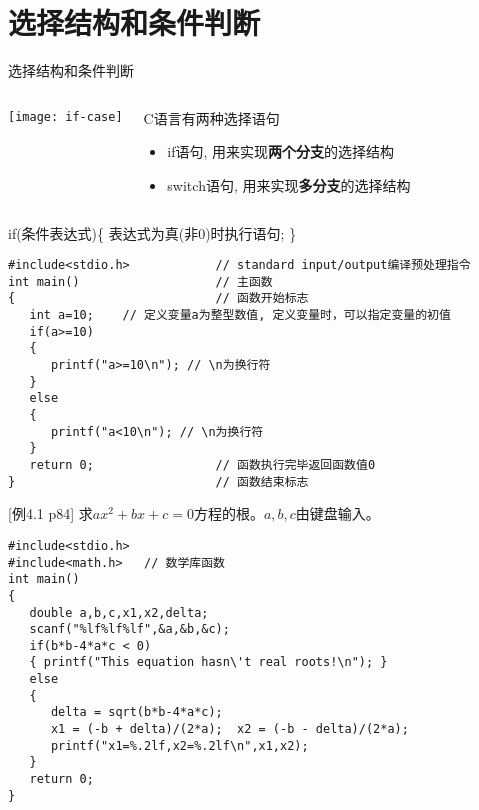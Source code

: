 
\section{选择结构和条件判断}

\begin{frame}{选择结构和条件判断}
\begin{columns}
	\texttt{[image: if-case]}
	\begin{block}{C语言有两种选择语句}
		\begin{itemize}
			\item if语句, 用来实现\textbf{两个分支}的选择结构
			\item switch语句, 用来实现\textbf{多分支}的选择结构
		\end{itemize}
	\end{block}
\end{columns}
\end{frame}

\begin{frame}[fragile]{if(条件表达式)\{ 表达式为真(非0)时执行语句; \}}
\begin{lstlisting}
#include<stdio.h>            // standard input/output编译预处理指令
int main()                   // 主函数
{                            // 函数开始标志
   int a=10;    // 定义变量a为整型数值, 定义变量时，可以指定变量的初值
   if(a>=10)
   {
      printf("a>=10\n"); // \n为换行符
   }
   else
   {
      printf("a<10\n"); // \n为换行符
   }
   return 0;                 // 函数执行完毕返回函数值0
}                            // 函数结束标志
\end{lstlisting}
\end{frame}

\begin{frame}
\small [例4.1 p84] 求$ax^2+bx+c=0$方程的根。$a,b,c$由键盘输入。
\begin{lstlisting}
#include<stdio.h>
#include<math.h>   // 数学库函数        
int main()                   
{  
   double a,b,c,x1,x2,delta;
   scanf("%lf%lf%lf",&a,&b,&c);
   if(b*b-4*a*c < 0) 
   { printf("This equation hasn\'t real roots!\n"); }
   else
   {
      delta = sqrt(b*b-4*a*c);
      x1 = (-b + delta)/(2*a);  x2 = (-b - delta)/(2*a);
      printf("x1=%.2lf,x2=%.2lf\n",x1,x2);
   }
   return 0;           
}                            
\end{lstlisting}
\end{frame}

